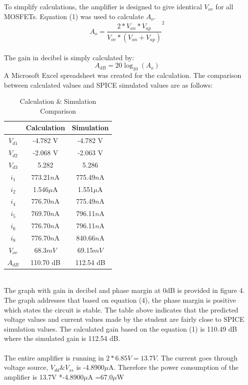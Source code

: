 \documentclass[conference,compsoc]{IEEEtran}
\begin{document}
To simplify calculations, the amplifier is designed to give identical \(V_{ov}\) for all MOSFETs. Equation (1) was used to calculate \(A_o\).
\begin{equation}
A_o = \frac{2*V_{an} * V_{ap}}{V_{ov}*(V_{an}+V_{ap})}^2
\end{equation}\\
The gain in decibel is simply calculated by:
\[
A_{dB} = 20 \log_{10}(A_o)
\]
A Microsoft Excel spreadsheet was created for the calculation. The comparison between calculated values and SPICE simulated values are as follows:\\
\begin{table}[!htb]
	\begin{center}
	\begin{tabular}{|c|c|c|}
	\hline
	&Calculation & Simulation\\
	\hline	
	\(V_{d1}\) & -4.782 V&-4.782 V\\
	\(V_{d2}\) & -2.068 V&-2.063 V\\
	\(V_{d3}\) & 5.282&5.286\\
	\(i_1\)&773.21\(n\)A&775.49\(n\)A\\
	\(i_2\)&1.546\(\mu\)A&1.551\(\mu\)A\\
	\(i_4\)&776.70\(n\)A&775.49\(n\)A\\
	\(i_5\)&769.70\(n\)A&796.11\(n\)A\\
	\(i_6\)&776.70\(n\)A&796.11\(n\)A\\
	\(i_8\)&776.70\(n\)A&840.66\(n\)A\\
	\(V_{ov}\)&68.3\(mV\)&69.15\(mV\)\\
	\(A_{dB}\)&110.70 dB &112.54 dB\\
	\hline
	\end{tabular}
	\end{center}
	\caption{Calculation \& Simulation Comparison}\label{table2 :}
\end{table}\\
The graph with gain in decibel and phase margin at 0dB is provided in figure 4.\\

The graph addresses that based on equation (4), the phase margin is positive which states the circuit is stable. The table above indicates that the predicted voltage values and current values made by the student are fairly close to SPICE simulation values. The calculated gain based on the equation (1) is 110.49 dB where the simulated gain is 112.54 dB.\\
\\The entire amplifier is running in \(2 * 6.85V = 13.7V\). The current goes through voltage source, \(V_{dd}\&V_{ss}\) is -4.8900\(\mu\)A. Therefore the power consumption of the amplifier is 13.7V *-4.8900\(\mu\)A =67.0\(\mu\)W
\end{document}
